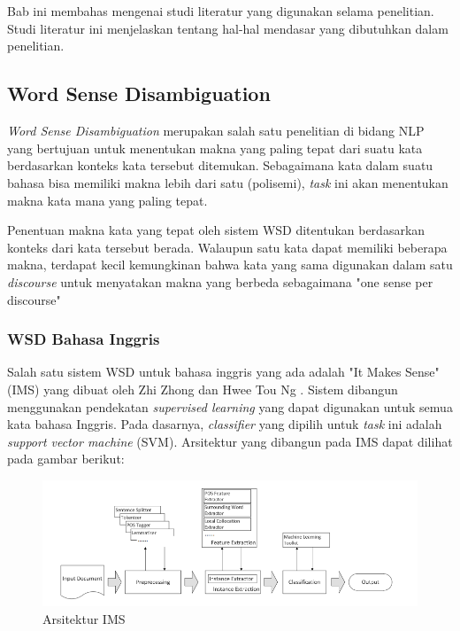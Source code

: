 \chapter{\babDua}
Bab ini membahas mengenai studi literatur yang digunakan selama penelitian. Studi literatur ini menjelaskan tentang hal-hal mendasar yang dibutuhkan dalam penelitian.

\section{Word Sense Disambiguation}
\textit{Word Sense Disambiguation} merupakan salah satu penelitian di bidang NLP yang bertujuan untuk menentukan makna yang paling tepat dari suatu kata berdasarkan konteks kata tersebut ditemukan. Sebagaimana kata dalam suatu bahasa bisa memiliki makna lebih dari satu (polisemi), \textit{task} ini akan menentukan makna kata mana yang paling tepat.

Penentuan makna kata yang tepat oleh sistem WSD ditentukan berdasarkan konteks dari kata tersebut berada. Walaupun satu kata dapat memiliki beberapa makna, terdapat kecil kemungkinan bahwa kata yang sama digunakan dalam satu \textit{discourse} untuk menyatakan makna yang berbeda sebagaimana "one sense per discourse" \citep{gale1992one}

\subsection{WSD Bahasa Inggris}
Salah satu sistem WSD untuk bahasa inggris yang ada adalah "It Makes Sense" (IMS) yang dibuat oleh Zhi Zhong dan Hwee Tou Ng \citep{zhong2010makes}. Sistem  dibangun menggunakan pendekatan \textit{supervised learning} yang dapat digunakan untuk semua kata bahasa Inggris. Pada dasarnya, \textit{classifier} yang dipilih untuk \textit{task} ini adalah \textit{support vector machine} (SVM). Arsitektur yang dibangun pada IMS dapat dilihat pada gambar berikut:

\begin{figure}
	\centering
	\includegraphics[width=1\linewidth]{adit_pics/Arsitektur-IMS}
	\caption{Arsitektur IMS}
	\label{fig:Arsitektur-IMS}
\end{figure}

